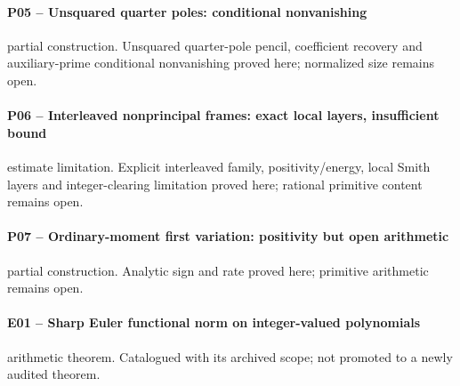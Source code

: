 \paragraph{P05 -- Unsquared quarter poles: conditional nonvanishing}\label{record-P05}
partial construction. Unsquared quarter-pole pencil, coefficient recovery and auxiliary-prime conditional nonvanishing proved here; normalized size remains open.
\par\smallskip{}\par
\paragraph{P06 -- Interleaved nonprincipal frames: exact local layers, insufficient bound}\label{record-P06}
estimate limitation. Explicit interleaved family, positivity/energy, local Smith layers and integer-clearing limitation proved here; rational primitive content remains open.
\par\smallskip{}\par
\paragraph{P07 -- Ordinary-moment first variation: positivity but open arithmetic}\label{record-P07}
partial construction. Analytic sign and rate proved here; primitive arithmetic remains open.
\par\smallskip{}\par
\paragraph{E01 -- Sharp Euler functional norm on integer-valued polynomials}\label{record-E01}
arithmetic theorem. Catalogued with its archived scope; not promoted to a newly audited theorem.
\par\smallskip{}\par
